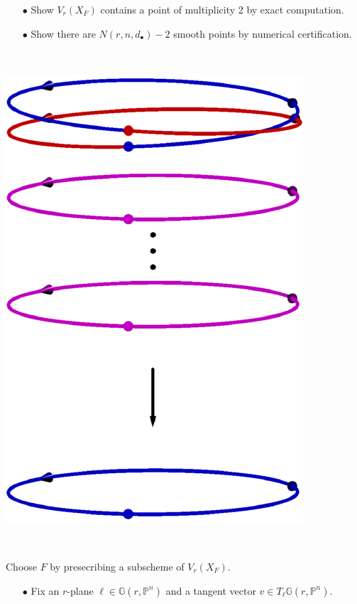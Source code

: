 \documentclass[final]{beamer}
\theoremstyle{thrm}
\newcommand{\tallminipage}{\begin{minipage}{.025\textwidth}~\vspace{0pt}~\end{minipage}}
\begin{document}
\begin{frame}
\begin{minipage}[t]{.3\textwidth}
\begin{minipage}{.65\textwidth}
\begin{enumerate}
\item[$\bullet$] Show $V_r(X_F)$ contains a point of multiplicity 2 by exact computation.

\item[$\bullet$] Show there are $N(r,n,d_\bullet)-2$ smooth points by numerical certification.
\end{enumerate}
\end{minipage}
%
\begin{minipage}{.02\textwidth}
~
\end{minipage}
%
\begin{minipage}{.3\textwidth}
\begin{center}
\includegraphics[scale=1]{figures/Harris.pdf}
\end{center}
\end{minipage}

\vspace{1cm}


\end{minipage}
%
\tallminipage
\begin{minipage}[t]{.3\textwidth}
Choose $F$ by presecribing a subscheme of $V_r(X_F)$.
\begin{enumerate}
\item[$\bullet$] Fix an $r$-plane $\ell\in\mathbb{G}(r,\mathbb{P}^n)$ and a tangent vector $v\in T_\ell\mathbb{G}(r,\mathbb{P}^n)$. 


\end{enumerate}
\end{minipage}
\end{frame}
\end{document}
